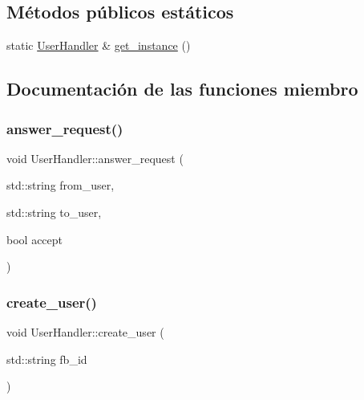 \subsection*{Métodos públicos estáticos}
\begin{DoxyCompactItemize}
\item 
static \hyperlink{classUserHandler}{User\+Handler} \& \hyperlink{classUserHandler_ac4f67acbcfe4262169243a11f677a337}{get\+\_\+instance} ()
\end{DoxyCompactItemize}


\subsection{Documentación de las funciones miembro}
\mbox{\label{classUserHandler_aed1b8c59e28db3653dfae14721308c7e}} 
\subsubsection{\texorpdfstring{answer\+\_\+request()}{answer\_request()}}
{\footnotesize\ttfamily void User\+Handler\+::answer\+\_\+request (\begin{DoxyParamCaption}\item[{std\+::string}]{from\+\_\+user,  }\item[{std\+::string}]{to\+\_\+user,  }\item[{bool}]{accept }\end{DoxyParamCaption})}

\mbox{\label{classUserHandler_a24a57bdf7dbc66654b2b87059474af3f}} 
\subsubsection{\texorpdfstring{create\+\_\+user()}{create\_user()}}
{\footnotesize\ttfamily void User\+Handler\+::create\+\_\+user (\begin{DoxyParamCaption}\item[{std\+::string}]{fb\+\_\+id }\end{DoxyParamCaption})}

\mbox{\label{classUserHandler_a37abd677dead8a0c023a760c80e32d88}} 
